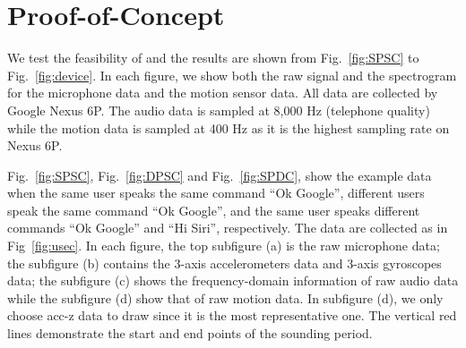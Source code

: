 \section{Proof-of-Concept}
We test the feasibility of {\shortname} and the results are shown from Fig.~\ref{fig:SPSC} to Fig.~\ref{fig:device}. In each figure, we show both the raw signal and the spectrogram for the microphone data and the motion sensor data. All data are collected by Google Nexus 6P. The audio data is sampled at 8,000 Hz (telephone quality) while the motion data is sampled at 400 Hz as it is the highest sampling rate on Nexus 6P.


Fig.~\ref{fig:SPSC}, Fig.~\ref{fig:DPSC} and Fig.~\ref{fig:SPDC}, show the example data when the same user speaks the same command ``Ok Google'', different users speak the same command ``Ok Google'', and the same user speaks different commands ``Ok Google'' and ``Hi Siri'', respectively. The data are collected as in Fig~\ref{fig:usec}. In each figure, the top subfigure (a) is the raw microphone data; the subfigure (b) contains the 3-axis accelerometers data and 3-axis gyroscopes data; the subfigure (c) shows the frequency-domain information of raw audio data while the subfigure (d) show that of raw motion data. In subfigure (d), we only choose acc-z data to draw since it is the most representative one. The vertical red lines demonstrate the start and end points of the sounding period.

